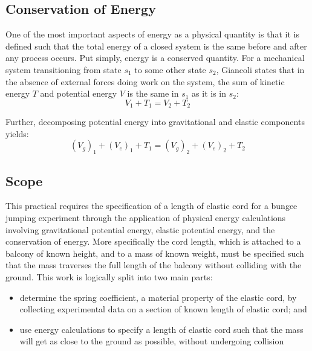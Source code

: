 \documentclass[a4paper]{article}
\begin{document}
\subsection{Conservation of Energy}
One of the most important aspects of energy as a physical quantity is that it is defined such that the total energy of a closed system is the same before and after any process occurs. Put simply, energy is a conserved quantity. For a mechanical system transitioning from state $s_1$ to some other state $s_2$, Giancoli states that in the absence of external forces doing work on the system, the sum of kinetic energy $T$ and potential energy $V$ is the same in $s_1$ as it is in $s_2$:
\begin{equation}
V_1 + T_1 = V_2 + T_2
\end{equation}

Further, decomposing potential energy into gravitational and elastic components yields:
\begin{equation}
(V_g)_1 + (V_e)_1 + T_1 = (V_g)_2 + (V_e)_2 + T_2
\end{equation} 

\subsection{Scope}
This practical requires the specification of a length of elastic cord for a bungee jumping experiment through the application of physical energy calculations involving gravitational potential energy, elastic potential energy, and the conservation of energy. More specifically the cord length, which is attached to a balcony of known height, and to a mass of known weight, must be specified such that the mass traverses the full length of the balcony without colliding with the ground. This work is logically split into two main parts:
\begin{itemize}
	\item determine the spring coefficient, a material property of the elastic cord, by collecting experimental data on a section of known length of elastic cord; and
	\item use energy calculations to specify a length of elastic cord such that the mass will get as close to the ground as possible, without undergoing collision
\end{itemize}

\newpage
\end{document}
